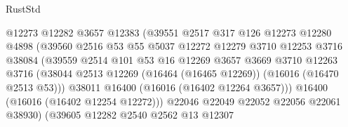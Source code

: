 \begin{lexlean}{RustStd}
\begin{coremodule}
                                    @12273
                                    @12282
                                    @3657
                                    @12383
                                    (@39551
                                      @2517
                                      @317
                                      @126
                                      @12273
                                      @12280
                                      @4898
                                      (@39560
                                        @2516
                                        @53
                                        @55
                                        @5037
                                        @12272
                                        @12279
                                        @3710
                                        @12253
                                        @3716
                                        @38084
                                        (@39559
                                          @2514
                                          @101
                                          @53
                                          @16
                                          @12269
                                          @3657
                                          @3669
                                          @3710
                                          @12263
                                          @3716
                                          (@38044
                                            @2513
                                            @12269
                                            (@16464 (@16465 @12269))
                                            (@16016 (@16470 @2513 @53)))
                                          @38011
                                          @16400
                                          (@16016 (@16402 @12264 @3657)))
                                        @16400
                                        (@16016 (@16402 @12254 @12272)))
                                      @22046
                                      @22049
                                      @22052
                                      @22056
                                      @22061
                                      @38930)
                                    (@39605
                                      @12282
                                      @2540
                                      @2562
                                      @13
                                      @12307

\end{coremodule}
\end{lexlean}
